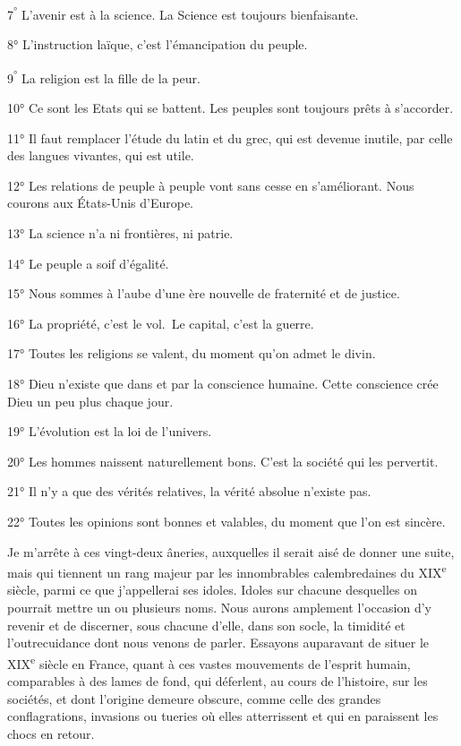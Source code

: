 \documentclass[french,twoside]{book} %
\begin{document}
7\textsuperscript{°} L’avenir est à la science. La Science est toujours bienfaisante.\par
8° L’instruction laïque, c’est l’émancipation du peuple.\par
9\textsuperscript{°} La religion est la fille de la peur.\par
10° Ce sont les Etats qui se battent. Les peuples sont toujours prêts à s’accorder.\par
11° Il faut remplacer l’étude du latin et du grec, qui est devenue inutile, par celle des langues vivantes, qui est utile.\par
12° Les relations de peuple à peuple vont sans cesse en s’améliorant. Nous courons aux États-Unis d’Europe.\par
13° La science n’a ni frontières, ni patrie.\par
14° Le peuple a soif d’égalité.\par
15° Nous sommes à l’aube d’une ère nouvelle de fraternité et de justice.\par
16° La propriété, c’est le vol. Le capital, c’est la guerre.\par
17° Toutes les religions se valent, du moment qu’on admet le divin.\par
18° Dieu n’existe que dans et par la conscience humaine. Cette conscience crée Dieu un peu plus chaque jour.\par
19° L’évolution est la loi de l’univers.\par
20° Les hommes naissent naturellement bons. C’est la société qui les pervertit.\par
21° Il n’y a que des vérités relatives, la vérité absolue n’existe pas.\par
22° Toutes les opinions sont bonnes et valables, du moment que l’on est sincère.\par
Je m’arrête à ces vingt-deux âneries, auxquelles il serait aisé de donner une suite, mais qui tiennent un rang majeur par les innombrables calembredaines du XIX\textsuperscript{e} siècle, parmi ce que j’appellerai ses idoles. Idoles sur chacune desquelles on pourrait mettre un ou plusieurs noms. Nous aurons amplement l’occasion d’y revenir et de discerner, sous chacune d’elle, dans son socle, la timidité et l’outrecuidance dont nous venons de parler. Essayons auparavant de situer le XIX\textsuperscript{e} siècle en France, quant à ces vastes mouvements de l’esprit humain, comparables à des lames de fond, qui déferlent, au cours de l’histoire, sur les sociétés, et dont l’origine demeure obscure, comme celle des grandes conflagrations, invasions ou tueries où elles atterrissent et qui en paraissent les chocs en retour.\par
\end{document}

